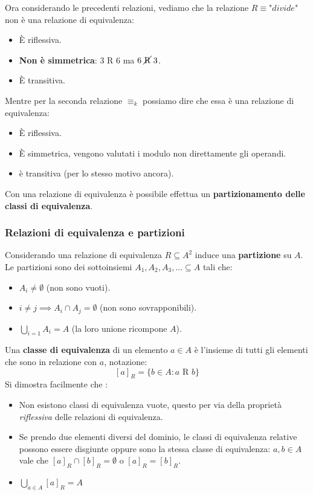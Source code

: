 \documentclass{article}
\begin{document}
Ora considerando le precedenti relazioni, vediamo che la relazione $R\equiv\textit{"divide"}$
non è una relazione di equivalenza:
\begin{itemize}
    \item È riflessiva.
    \item \textbf{Non è simmetrica}: $3\text{ R }6$ ma $6\text{ \cancel{R} }3$.
    \item È transitiva.
\end{itemize}
Mentre per la seconda relazione $\equiv_k$ possiamo dire che essa è una
relazione di equivalenza:
\begin{itemize}
    \item È riflessiva.
    \item È simmetrica, vengono valutati i modulo non direttamente gli operandi.
    \item è transitiva (per lo stesso motivo ancora).
\end{itemize}
Con una relazione di equivalenza è possibile effettua un \textbf{partizionamento
    delle classi di equivalenza}.
\subsubsection{Relazioni di equivalenza e partizioni}
Considerando una relazione di equivalenza $R\subseteq A^2$ induce una
\textbf{partizione} su $A$.
Le partizioni sono dei sottoinsiemi $A_1,A_2,A_3,...\subseteq A$ tali che:
\begin{itemize}
    \item $A_i\neq\emptyset$ (non sono vuoti).
    \item $i\neq j\implies A_i \cap A_j =\emptyset$ (non sono sovrapponibili).
    \item $\bigcup\limits_{i=1} A_i=A$ (la loro unione ricompone $A$).
\end{itemize}

Una \textbf{classe di equivalenza} di un elemento $a\in A$ è l'insieme di tutti
gli elementi che sono in relazione con $a$, notazione:
$$[a]_R=\{b\in A: a\text{ R }b\}$$
Si dimostra facilmente che :
\begin{itemize}
    \item Non esistono classi di equivalenza vuote, questo per via della proprietà
          \textit{riflessiva} delle relazioni di equivalenza.
    \item Se prendo due elementi diversi del dominio, le classi di equivalenza relative
          possono essere disgiunte oppure sono la stessa classe di equivalenza: $a,b\in A$ vale che
          $[a]_R\cap[b]_R=\emptyset$ o $[a]_R = [b]_R$.
    \item $\bigcup\limits_{a\in A}[a]_R=A$
\end{itemize}
\end{document}
